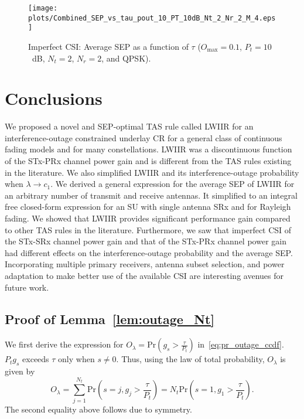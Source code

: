 \documentclass[12pt,draftcls,peerreview,onecolumn]{IEEEtran}
\newcommand{\brac}[1]{\left({#1}\right)}
\newcommand{\tendsto}{\to}
\newcommand{\prob}[1]{\text{Pr}\brac{#1}}
\newcommand{\lam}{\lambda}
\newcommand{\Nt}{{N_t}}
\newcommand{\Nr}{{N_r}}
\newcommand{\Pt}{{P_t}}
\newcommand{\puch}{g}
\newcommand{\gk}[1]{{\puch_{#1}}}
\newcommand{\outmax}{O_{\text{max}}}
\newcommand{\itau}{\tau}
\newcommand{\out}{O}
\newcommand{\taubypt}{\frac{\itau}{\Pt}}
\newcommand{\gkgrtaubypt}[1]{{\gk{#1}}>\taubypt}
\newcommand{\outlam}{\out_{\lam}}
\begin{document}
\begin{figure}
	\centering \texttt{[image: plots/Combined\_SEP\_vs\_tau\_pout\_10\_PT\_10dB\_Nt\_2\_Nr\_2\_M\_4.eps]}
	\caption{Imperfect CSI: Average SEP as a function of $\itau$ ($\outmax=0.1$, $\Pt = 10$~dB, $\Nt = 2$, $\Nr = 2$, and QPSK).}
	\label{fig:sep_vs_tau_imp_CSI}
\end{figure}




\section{Conclusions}
\label{sec:conclusions}
We proposed a novel and SEP-optimal TAS rule called LWIIR for an interference-outage constrained underlay CR for a general class of continuous fading models and for many constellations. LWIIR was a discontinuous function of the STx-PRx channel power gain and is different from the TAS rules existing in the literature. We also simplified LWIIR and its interference-outage probability when $\lambda \tendsto c_1$. We derived a general expression for the average SEP of LWIIR for an arbitrary number of transmit and receive antennas. It simplified to an integral free closed-form expression for an SU with single antenna SRx and for Rayleigh fading. We showed that LWIIR provides significant performance gain compared to other TAS rules in the literature. Furthermore, we saw that imperfect CSI of the STx-SRx channel power gain and that of the STx-PRx channel power gain had different effects on the interference-outage probability and the average SEP.  Incorporating multiple primary receivers, antenna subset selection, and power adaptation to make better use of the available CSI are interesting avenues for future work.

\appendix
\subsection{Proof of Lemma~\ref{lem:outage_Nt}}
\label{proof:outage_Nt}
We first derive the expression for $\outlam = \prob{\gkgrtaubypt{s}}$ in~\eqref{eq:pr_outage_ccdf}. $\Pt \gk{s}$ exceeds $\itau$ only when $s\neq0$. Thus, using the law of total probability, $\outlam$ is given by
%
\newcommand{\eqidx}{j}
\begin{equation}
\outlam =  \sum_{\eqidx=1}^{\Nt}\text{Pr}\brac{s=\eqidx,\gk{\eqidx}>\taubypt}=\Nt\text{Pr}\brac{s=1,\gk{1}>\taubypt}.
\label{eq:out_1}
\end{equation}
%
The second equality above follows due to symmetry.
\end{document}
